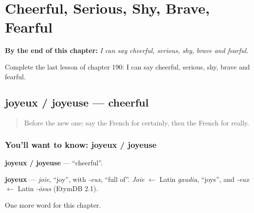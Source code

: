 
\chapter{Cheerful, Serious, Shy, Brave, Fearful}
\label{ch:fr-cheerful-serious-shy-brave-fearful}

\begin{chapteropening}
\textbf{By the end of this chapter:} \emph{I can say cheerful, serious, shy, brave and fearful.}

Complete the last lesson of chapter 190: I can say cheerful, serious, shy, brave and fearful.
\end{chapteropening}

\section[joyeux / joyeuse]{joyeux / joyeuse — cheerful}

\label{lesson:FR-C190-joyeux-joyeuse}



\begin{quote}
Before the new one: say the French for certainly, then the French for really.
\end{quote}

\subsection*{You'll want to know: joyeux / joyeuse}
\textbf{joyeux / joyeuse} — \textquotedblleft{}cheerful\textquotedblright{}.

\begin{cousinweb}
\textbf{joyeux} — \emph{joie}, \textquotedblleft{}joy\textquotedblright{}, with \emph{-eux}, \textquotedblleft{}full of\textquotedblright{}. \emph{Joie} $\leftarrow$ Latin \emph{gaudia}, \textquotedblleft{}joys\textquotedblright{}, and \emph{-eux} $\leftarrow$ Latin \emph{-ōsus} (EtymDB 2.1).
\end{cousinweb}

\begin{grammarlens}[title={What you've built}]
One more word for this chapter.
\end{grammarlens}

